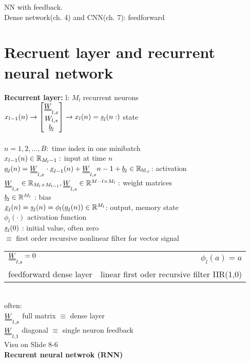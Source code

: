 NN with feedback.\\
Dense network(ch. 4) and CNN(ch. 7): feedforward
\section{Recruent layer and recurrent neural network}
\textbf{Recurrent layer: }l: $ M_l $ recurrent neurons\\
$x_{l-1} (n) \rightarrow  \left[\begin{matrix}
\W_{l,x }\\
W_{l,s} \\
\b_l 
\end{matrix} \right]  \rightarrow x_l(n) = \s_l (n :)$ state \\
\\
$ n= 1,2, ..., B: $ time index in one minibatch \\
$  x_{l-1}(n ) \in \mathbb R_{M_l -1 }:  $ input at time $  n $\\
$ \a_l (n) = \W _{l,x } \cdot \x_{l-1 } (n) + \W_{l,s} \sl n-1    + \b_l \in \R_{M_l} $: activation\\
$ \W_{l,x } \in \R _{M_l \times M_{l-1 }} , \W_{l,s } \in \R ^{M-l \times M_l } : $ weight matrices \\
$  {\underline b}_l \in \mathbb R^{M_l } $ : bias \\
 $ {\underline x}_l (n) = {\underline s}_l (n) = \phi_l ({\underline a}_l (n)) \in \mathbb R ^{M_l } $: output, memory state \\
 $  \phi_l (\cdot ) $ activation function \\
 $  {\underline s}_l  (0 ) $ : initial value, often zero \\
 $  \equiv  $ first order recursive nonlinear filter for vector signal\\
 \begin{tabular}{lr}
 	$ \W_{l,s} = 0 $ & $  \phi_l(a) = a  $\\
 	feedforward dense layer & linear first oder recursive filter IIR(1,0)
 \end{tabular}\\
often:\\
\textbullet $  \W _{l,x } $ full matrix $  \equiv  $ dense layer \\
\textbullet $    \W_{l,1 } $ diagonal $  \equiv  $ single neuron feedback\\
Visu on Slide 8-6\\
\textbf{Recurent neural netwrok (RNN)}\\
